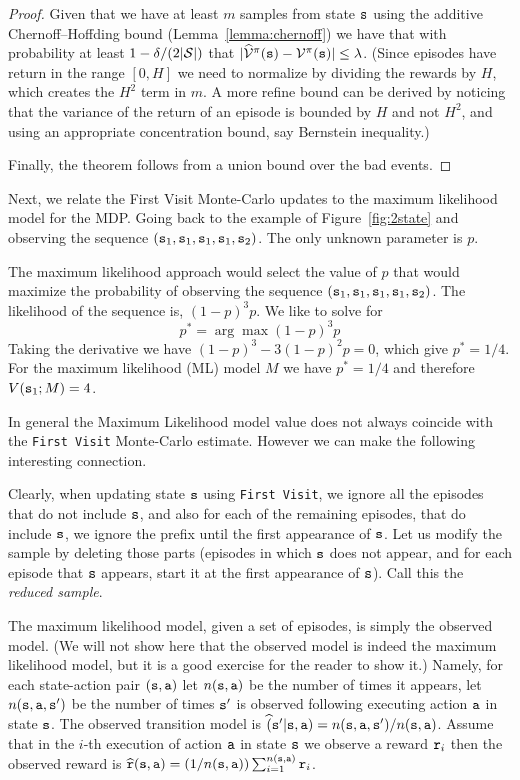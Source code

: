 \begin{advanced}
\begin{proof}
Given that we have at least $m$ samples from state ${\tt s}$ using
the additive Chernoff--Hoffding bound (Lemma~\ref{lemma:chernoff})
we have that with probability at least $1-\delta/(2|\mathcal{S}|)$ that
$|\widehat{\mathcal{V}}^\pi({\tt s})-\mathcal{V}^\pi({\tt s})|\leq
\lambda$. (Since episodes have return in the range $[0,H]$ we need
to normalize by dividing the rewards by $H$, which creates the $H^2$
term in $m$. A more refine bound can be derived by noticing that the
variance of the return of an episode is bounded by $H$ and not
$H^2$, and using an appropriate concentration bound, say Bernstein
inequality.)

Finally, the theorem follows from a union bound over the bad events.
\end{proof}


Next, we relate the First Visit Monte-Carlo updates to the maximum
likelihood model for the MDP. Going back to the example of
Figure~\ref{fig:2state} and observing the sequence
$({\tt s}_1,{\tt s}_1,{\tt s}_1,{\tt s}_1,{\tt s}_2)$. The only unknown
parameter is $p$.

The maximum likelihood approach would select the value of $p$ that
would maximize the probability of observing the sequence
$({\tt s}_1,{\tt s}_1,{\tt s}_1,{\tt s}_1,{\tt s}_2)$. The likelihood of
the sequence is, $(1-p)^3p$. We like to solve for
\[
p^* = \arg\max (1-p)^3 p
\]
Taking the derivative we have $(1-p)^3-3(1-p)^2p=0$, which give
$p^*=1/4$.
%
For the maximum likelihood (ML) model $M$ we have $p^*=1/4$ and
therefore $V({\tt s}_1;M)=4$.

In general the Maximum Likelihood model value does not always
coincide with the {\tt First Visit} Monte-Carlo estimate. However we
can make the following interesting connection.

Clearly, when updating state ${\tt s}$ using {\tt First Visit}, we
ignore all the episodes that do not include ${\tt s}$, and also for
each of the remaining episodes, that do include ${\tt s}$, we ignore the
prefix until the first appearance of ${\tt s}$. Let us modify the
sample by deleting those parts (episodes in which ${\tt s}$ does not
appear, and for each episode that ${\tt s}$ appears, start it at the
first appearance of ${\tt s}$). Call this the {\em reduced sample}.

The maximum likelihood model, given a set of episodes, is simply the
observed model. (We will not show here that the observed model is
indeed the maximum likelihood model, but it is a good exercise for the reader to show it.) 
Namely, for each state-action
pair $({\tt s},{\tt a})$ let $n({\tt s},{\tt a})$ be the number of
times it appears, let $n({\tt s},{\tt a},{\tt s}')$ be the number of
times ${\tt s}'$ is observed following executing action ${\tt a}$ in
state ${\tt s}$. The observed transition model is
$\widehat({\tt s}'|{\tt s},{\tt a})=n({\tt s},{\tt a},{\tt s}')/n({\tt s},{\tt a})$.
Assume that in the $i$-th execution of action ${\tt a}$ in state
${\tt s}$ we observe a reward ${\tt r}_i$ then the observed reward is
$\widehat{{\tt r}}({\tt s},{\tt a})=(1/n({\tt s},{\tt a}))\sum_{i=1}^{n({\tt s},{\tt a})}
{\tt r}_i$.


\end{advanced}
